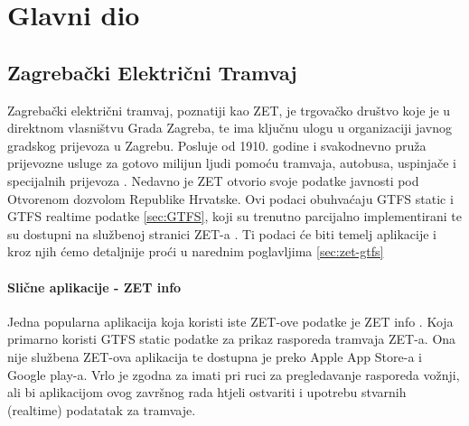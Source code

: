 \documentclass[zavrsnirad]{fer}
\begin{document}



\chapter{Glavni dio}
\label{pog:glavni_dio}

\section{Zagrebački Električni Tramvaj}

Zagrebački električni tramvaj, poznatiji kao ZET, je trgovačko društvo koje je u direktnom
vlasništvu Grada Zagreba, te ima ključnu ulogu u organizaciji javnog gradskog prijevoza u Zagrebu.
Posluje od 1910. godine i svakodnevno pruža prijevozne usluge za gotovo milijun ljudi pomoću
tramvaja, autobusa, uspinjače i specijalnih prijevoza \cite{ZET}.
Nedavno je ZET otvorio svoje podatke javnosti pod Otvorenom dozvolom Republike Hrvatske. Ovi podaci obuhvaćaju GTFS static i GTFS realtime podatke \ref{sec:GTFS}, koji su trenutno parcijalno implementirani te su dostupni na službenoj stranici ZET-a \cite{ZET-GTFS}.
Ti podaci će biti temelj aplikacije i kroz njih ćemo detaljnije proći u narednim poglavljima \ref{sec:zet-gtfs}

\subsubsection{Slične aplikacije - ZET info}
Jedna popularna aplikacija koja koristi iste ZET-ove podatke je ZET info \cite{ZET-info}. Koja primarno koristi GTFS static podatke za prikaz rasporeda tramvaja ZET-a. Ona nije službena ZET-ova aplikacija te dostupna je preko Apple App Store-a i Google play-a. Vrlo je zgodna za imati pri ruci za pregledavanje rasporeda vožnji, ali bi aplikacijom ovog završnog rada htjeli ostvariti i upotrebu stvarnih (realtime) podatatak za tramvaje.
\end{document}
